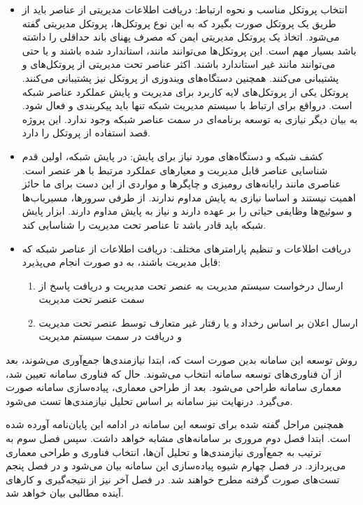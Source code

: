\begin{itemize}
    \item انتخاب پروتکل مناسب و نحوه ارتباط: دریافت اطلاعات مدیریتی از عناصر باید از طریق یک پروتکل صورت بگیرد که به این نوع پروتکل‌ها، پروتکل مدیریتی گفته می‌شود. اتخاذ یک پروتکل مدیریتی ایمن که مصرف پهنای باند حداقلی را داشته باشد بسیار مهم است. این پروتکل‌ها می‌توانند مانند، استاندارد شده باشند و یا حتی می‌توانند مانند  غیر استاندارد باشند. اکثر عناصر تحت مدیریتی از پروتکل‌های  و   پشتیبانی می‌کنند. همچنین دستگاه‌های ویندوزی از پروتکل  نیز پشتیبانی می‌کنند. پروتکل   یکی از پروتکل‌های لایه کاربرد برای مدیریت و پایش عملکرد عناصر شبکه است. درواقع برای ارتباط با سیستم مدیریت شبکه تنها باید پیکربندی و فعال شود. به بیان دیگر نیازی به توسعه برنامه‌ای در سمت عناصر شبکه وجود ندارد\cite{hare2011simple}. این پروژه قصد استفاده از پروتکل  را دارد.
\newpage
    \item کشف شبکه و دستگاه‌های مورد نیاز برای پایش: در پایش شبکه، اولین قدم شناسایی عناصر قابل مدیریت و معیارهای عملکرد مرتبط با هر عنصر است. عناصری مانند رایانه‌های رومیزی و چاپگرها و مواردی از این دست برای ما حائز اهمیت نیستند و اساسا نیازی به پایش مداوم ندارند. از طرفی سرورها، مسیریاب‌ها و سوئیچ‌ها وظایفی حیاتی را بر عهده دارند و نیاز به پایش مداوم دارند. ابزار پایش شبکه باید قادر باشد تا عناصر تحت مدیریت را شناسایی کند.
    \item دریافت اطلاعات و تنظیم پارامترهای مختلف: دریافت اطلاعات از عناصر شبکه که قابل مدیریت باشند، به دو صورت انجام می‌پذیرد:
    \begin{enumerate}
        \item ارسال درخواست سیستم مدیریت به عنصر تحت مدیریت و دریافت پاسخ از سمت عنصر تحت مدیریت
        \item ارسال اعلان بر اساس رخداد و یا رفتار غیر متعارف توسط عنصر تحت مدیریت و دریافت در سمت سیستم مدیریت
    \end{enumerate}
\end{itemize}


روش توسعه این سامانه بدین صورت است که، ابتدا نیازمندی‌ها جمع‌آوری می‌شوند، بعد از آن فناوری‌های توسعه سامانه انتخاب می‌شوند. حال که فناوری سامانه تعیین شد، معماری سامانه طراحی می‌شود. بعد از طراحی معماری، پیاده‌سازی سامانه صورت می‌گیرد. درنهایت نیز سامانه بر اساس تحلیل نیازمندی‌ها تست می‌شود. 

همچنین مراحل گفته شده برای توسعه این سامانه در ادامه این پایان‌نامه آورده شده است. ابتدا فصل دوم مروری بر سامانه‌های مشابه خواهد داشت. سپس فصل سوم به ترتیب به جمع‌آوری نیازمندی‌ها و تحلیل آن‌ها، انتخاب فناوری و طراحی معماری می‌پردازد. در فصل چهارم شیوه پیاده‌سازی این سامانه بیان می‌شود و در فصل پنجم تست‌های صورت گرفته مطرح خواهند شد. در فصل آخر نیز از نتیجه‌گیری و کارهای آینده مطالبی بیان خواهد شد.

